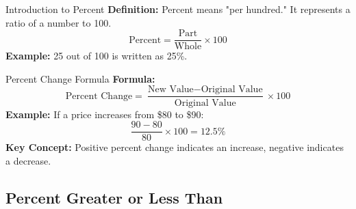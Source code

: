 \documentclass{beamer}
\begin{document}
\begin{frame}{Introduction to Percent}
    \textbf{Definition:} Percent means "per hundred." It represents a ratio of a number to 100.
    \[
    \text{Percent} = \frac{\text{Part}}{\text{Whole}} \times 100
    \]
    \textbf{Example:} 25 out of 100 is written as 25\%.
\end{frame}

\begin{frame}{Percent Change Formula}
    \textbf{Formula:}
    \[
    \text{Percent Change} = \frac{\text{New Value} - \text{Original Value}}{\text{Original Value}} \times 100
    \]
    \textbf{Example:} If a price increases from \$80 to \$90:
    \[
    \frac{90 - 80}{80} \times 100 = 12.5\%
    \]
    \textbf{Key Concept:} Positive percent change indicates an increase, negative indicates a decrease.
\end{frame}


\begin{frame}
\section{Percent Greater or Less Than}
\end{frame}
\end{document}
